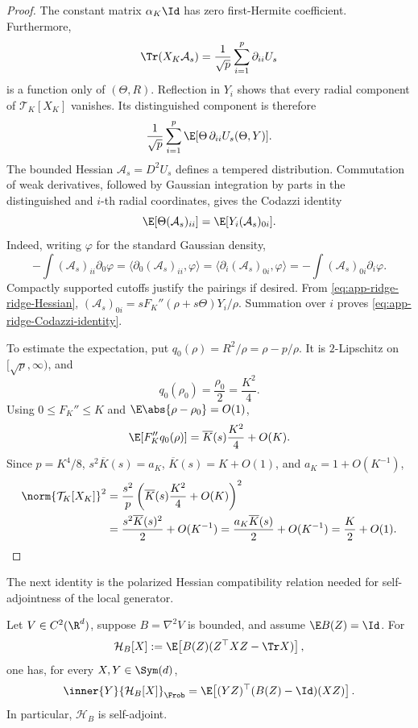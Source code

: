 \begin{proof}
The constant matrix \(\alpha_K\Id\) has zero first-Hermite coefficient.
Furthermore,
\[
  \Tr(X_K\mathcal A_s)
  =
  \frac1{\sqrt p}\sum_{i=1}^p\partial_{ii}U_s
\]
is a function only of \((\Theta,R)\).  Reflection in \(Y_i\) shows that
every radial component of \(\mathcal T_K[X_K]\) vanishes.  Its distinguished
component is therefore
\[
  \frac1{\sqrt p}\sum_{i=1}^p
  \E[\Theta\,\partial_{ii}U_s(\Theta,Y)].
\]
The bounded Hessian \(\mathcal A_s=D^2U_s\) defines a tempered
distribution.  Commutation of weak derivatives, followed by Gaussian
integration by parts in the distinguished and \(i\)-th radial coordinates,
gives the Codazzi identity
\[
  \E[\Theta(\mathcal A_s)_{ii}]
  =
  \E[Y_i(\mathcal A_s)_{0i}].
\]
Indeed, writing \(\varphi\) for the standard Gaussian density,
\[
  -\int(\mathcal A_s)_{ii}\partial_0\varphi
  =
  \langle\partial_0(\mathcal A_s)_{ii},\varphi\rangle
  =
  \langle\partial_i(\mathcal A_s)_{0i},\varphi\rangle
  =
  -\int(\mathcal A_s)_{0i}\partial_i\varphi.
\]
Compactly supported cutoffs justify the pairings if desired.  From
\eqref{eq:app-ridge-ridge-Hessian},
\((\mathcal A_s)_{0i}=sF_K''(\rho+s\Theta)Y_i/\rho\).
Summation over \(i\) proves
\eqref{eq:app-ridge-Codazzi-identity}.

To estimate the expectation, put
\(q_0(\rho)=R^2/\rho=\rho-p/\rho\).  It is \(2\)-Lipschitz on
\([\sqrt p,\infty)\), and
\[
  q_0(\rho_0)=\frac{\rho_0}{2}=\frac{K^2}{4}.
\]
Using \(0\leq F_K''\leq K\) and
\(\E\abs{\rho-\rho_0}=O(1)\),
\begin{equation}
  \E[F_K''q_0(\rho)]
  =
  \overline K(s)\frac{K^2}{4}+O(K).
  \label{eq:app-ridge-coupling-expectation}
\end{equation}
Since \(p=K^4/8\), \(s^2\overline K(s)=a_K\),
\(\overline K(s)=K+O(1)\), and \(a_K=1+O(K^{-1})\),
\begin{align*}
  \norm{\mathcal T_K[X_K]}^2
  &=
  \frac{s^2}{p}
  \left(\overline K(s)\frac{K^2}{4}+O(K)\right)^2\\
  &=
  \frac{s^2\overline K(s)^2}{2}+O(K^{-1})
  =
  \frac{a_K\overline K(s)}2+O(K^{-1})
  =
  \frac K2+O(1).
\end{align*}
\end{proof}

The next identity is the polarized Hessian compatibility relation needed
for self-adjointness of the local generator.

\begin{lemma}
\label{lem:app-ridge-second-Hermite}
Let \(V\in C^2(\R^d)\), suppose \(B=\nabla^2V\) is bounded, and assume
\(\E B(Z)=\Id\).  For
\[
  \mathcal H_B[X]
  :=
  \E\!\left[B(Z)(Z^\top XZ-\Tr X)\right],
\]
one has, for every \(X,Y\in\Sym(d)\),
\begin{equation}
  \inner{Y}{\mathcal H_B[X]}_{\Frob}
  =
  \E\!\left[
    (YZ)^\top(B(Z)-\Id)(XZ)
  \right].
  \label{eq:app-ridge-second-Hermite-identity}
\end{equation}
In particular, \(\mathcal H_B\) is self-adjoint.
\end{lemma}

